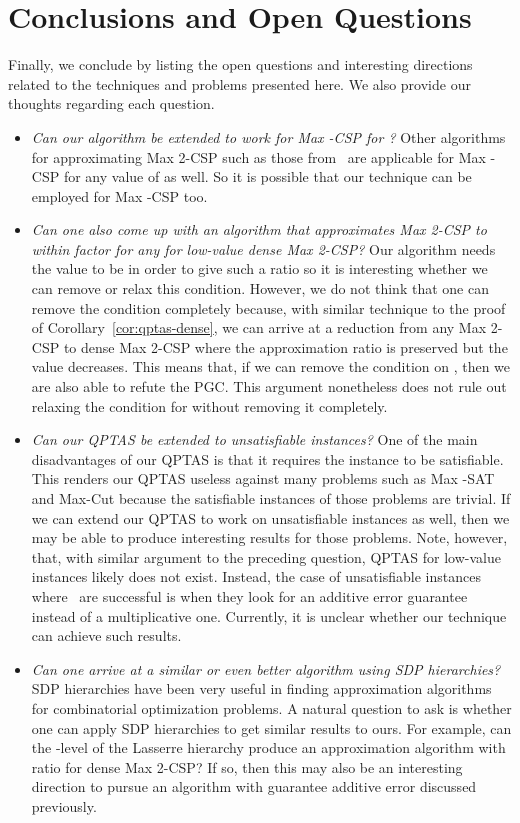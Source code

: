 \documentclass{article}
\begin{document}
\section{Conclusions and Open Questions}
Finally, we conclude by listing the open questions and interesting directions related to the techniques and problems presented here. We also provide our thoughts regarding each question.
\begin{itemize}
\item {\em Can our algorithm be extended to work for {\sc Max -CSP} for ?} Other algorithms for approximating {\sc Max 2-CSP} such as those from~\cite{Alon:2003:RSA:963875.963877, AKK95, BMHS11} are applicable for {\sc Max -CSP} for any value of  as well. So it is possible that our technique can be employed for {\sc Max -CSP} too.
\item {\em Can one also come up with an algorithm that approximates {\sc Max 2-CSP} to within  factor for any  for low-value dense {\sc Max 2-CSP}?} Our algorithm needs the value  to be  in order to give such a ratio so it is interesting whether we can remove or relax this condition. However, we do not think that one can remove the condition completely because, with similar technique to the proof of Corollary~\ref{cor:qptas-dense}, we can arrive at a reduction from any {\sc Max 2-CSP} to dense {\sc Max 2-CSP} where the approximation ratio is preserved but the value decreases. This means that, if we can remove the condition on , then we are also able to refute the PGC. This argument nonetheless does not rule out relaxing the condition for  without removing it completely.
\item {\em Can our QPTAS be extended to unsatisfiable instances?} One of the main disadvantages of our QPTAS is that it requires the instance to be satisfiable. This renders our QPTAS useless against many problems such as {\sc Max -SAT} and {\sc Max-Cut} because the satisfiable instances of those problems are trivial. If we can extend our QPTAS to work on unsatisfiable instances as well, then we may be able to produce interesting results for those problems.  Note, however, that, with similar argument to the preceding question, QPTAS for low-value instances likely does not exist. Instead, the case of unsatisfiable instances where~\cite{Alon:2003:RSA:963875.963877, AKK95, BMHS11} are successful is when they look for an additive error guarantee instead of a multiplicative one. Currently, it is unclear whether our technique can achieve such results.
\item {\em Can one arrive at a similar or even better algorithm using SDP hierarchies?} SDP hierarchies have been very useful in finding approximation algorithms for combinatorial optimization problems. A natural question to ask is whether one can apply SDP hierarchies to get similar results to ours. For example, can the -level of the Lasserre hierarchy produce an approximation algorithm with ratio  for dense {\sc Max 2-CSP}? If so, then this may also be an interesting direction to pursue an algorithm with guarantee additive error discussed previously.
\end{itemize}




\end{document}
